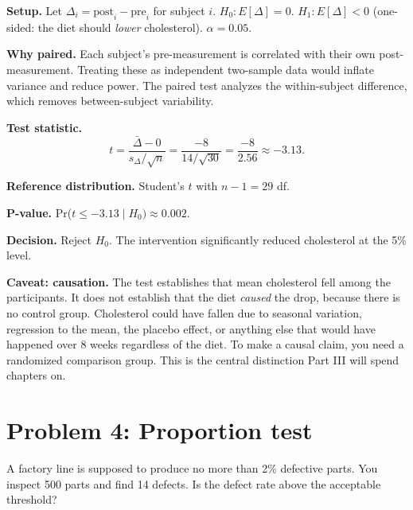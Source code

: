 \documentclass[
  letterpaper,
  11pt,
  twoside,
  openany]{scrbook}
\begin{document}
\begin{tcolorbox}[enhanced jigsaw, arc=.35mm, bottomrule=.15mm, bottomtitle=1mm, breakable, colback=white, colbacktitle=quarto-callout-note-color!10!white, colframe=quarto-callout-note-color-frame, coltitle=black, left=2mm, leftrule=.75mm, opacityback=0, opacitybacktitle=0.6, rightrule=.15mm, title=\textcolor{quarto-callout-note-color}{\faInfo}\hspace{0.5em}{Solution to Problem 3}, titlerule=0mm, toprule=.15mm, toptitle=1mm]

\textbf{Setup.} Let \(\Delta_i = \text{post}_i - \text{pre}_i\) for
subject \(i\). \(H_0: E[\Delta] = 0\). \(H_1: E[\Delta] < 0\)
(one-sided: the diet should \emph{lower} cholesterol).
\(\alpha = 0.05\).

\textbf{Why paired.} Each subject's pre-measurement is correlated with
their own post-measurement. Treating these as independent two-sample
data would inflate variance and reduce power. The paired test analyzes
the within-subject difference, which removes between-subject
variability.

\textbf{Test statistic.} \[
t = \frac{\bar{\Delta} - 0}{s_\Delta / \sqrt{n}} = \frac{-8}{14 / \sqrt{30}} = \frac{-8}{2.56} \approx -3.13.
\]

\textbf{Reference distribution.} Student's \(t\) with \(n - 1 = 29\) df.

\textbf{P-value.} Pr(\(t \leq -3.13 \mid H_0) \approx 0.002\).

\textbf{Decision.} Reject \(H_0\). The intervention significantly
reduced cholesterol at the 5\% level.

\textbf{Caveat: causation.} The test establishes that mean cholesterol
fell among the participants. It does not establish that the diet
\emph{caused} the drop, because there is no control group. Cholesterol
could have fallen due to seasonal variation, regression to the mean, the
placebo effect, or anything else that would have happened over 8 weeks
regardless of the diet. To make a causal claim, you need a randomized
comparison group. This is the central distinction Part III will spend
chapters on.

\end{tcolorbox}

\section{Problem 4: Proportion test}\label{problem-4-proportion-test}

A factory line is supposed to produce no more than 2\% defective parts.
You inspect 500 parts and find 14 defects. Is the defect rate above the
acceptable threshold?
\end{document}
